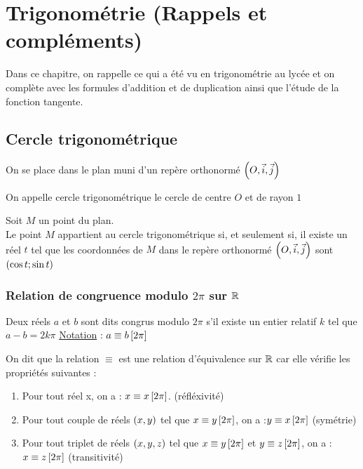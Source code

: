 \chapter{Trigonométrie (Rappels et compléments)}

\minitoc

Dans ce chapitre, on rappelle ce qui a été vu en trigonométrie au lycée et on complète avec les formules
d’addition et de duplication ainsi que l’étude de la fonction tangente.

\section{Cercle trigonométrique}

On se place dans le plan muni d'un repère orthonormé \(\left(O,\vec{i},\vec{j}\right)\)

\begin{defi}

	On appelle cercle trigonométrique le cercle de centre \(O\) et de rayon \(1\)

\end{defi}

\begin{prop}
	Soit \(M\) un point du plan. \\
	Le point \(M\) appartient au cercle trigonométrique si, et seulement si, il existe un réel \(t\) tel que les coordonnées de \(M\) dans le repère orthonormé \(\left(O,\vec{i},\vec{j}\right)\) sont \(\left(\cos t ; \sin t\right)\)
\end{prop}

\subsection{Relation de congruence modulo \(2\pi\) sur \(\mathbb{R}\)}

\begin{defi}
	Deux réels \(a\) et \(b\) sont dits congrus modulo \(2\pi\) s'il existe un entier relatif \(k\) tel que \(a-b = 2k\pi\)
	\underline{Notation} : \(a \equiv b \left[2 \pi\right] \)
\end{defi}

\begin{defprop}
	On dit que la relation \(\equiv\) est une relation d'équivalence sur \(\mathbb{R}\) car elle vérifie les propriétés suivantes :
	\begin{enumerate}
		\item Pour tout réel x, on a : \(x \equiv x \left[2 \pi\right]\). \hfill (réfléxivité)
		\item Pour tout couple de réels \(\left(x,y\right)\) tel que \( x \equiv y \left[2 \pi\right] \), on a :\( y \equiv x \left[2 \pi\right] \) \hfill (symétrie)
		\item Pour tout triplet de réels \(\left(x,y,z\right)\) tel que \(x \equiv y \left[2 \pi\right] \) et \( y \equiv z \left[2 \pi\right] \), on a : \( x \equiv z \left[2 \pi\right] \) \hfill (transitivité)
	\end{enumerate}
\end{defprop}



